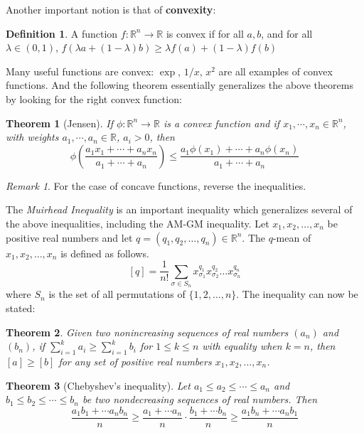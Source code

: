 \documentclass{article}
\newtheorem{theorem}{Theorem}[section]
\theoremstyle{definition}
\newtheorem{definition}{Definition}[section]
\theoremstyle{remark}
\newtheorem*{remark}{Remark}
\begin{document}
Another important notion is that of \textbf{convexity}:
\begin{definition}
A function $f: \mathbb{R}^n \rightarrow \mathbb{R}$ is convex if for all $a,b$, and for all $\lambda \in (0,1)$, $f(\lambda a + (1-\lambda)b) \ge \lambda f(a) + (1-\lambda)f(b)$
\end{definition}
Many useful functions are convex: $\exp$, $1/x$, $x^2$ are all examples of convex functions. And the following theorem essentially generalizes the above theorems by looking for the right convex function:
\begin{theorem}[Jensen]
If $\phi: \mathbb{R}^n \rightarrow \mathbb{R}$ is a convex function and if $x_1,\cdots,x_n \in \mathbb{R}^n$, with weights $a_1,\cdots,a_n \in \mathbb{R}$, $a_i > 0$, then  
\begin{equation}
    \phi \left( \frac{a_1x_1 + \cdots + a_nx_n}{a_1 + \cdots + a_n} \right) \le \frac{a_1\phi(x_1) + \cdots + a_n\phi(x_n)}{a_1 + \cdots + a_n}
\end{equation}
\end{theorem}
\begin{remark}
For the case of concave functions, reverse the inequalities.
\end{remark}
The \textit{Muirhead Inequality} is an important inequality which generalizes several of the above inequalities, including the AM-GM inequality. Let $x_1,x_2,\dots, x_n$ be positive real numbers and let $q = (q_1,q_2,\dots, q_n) \in \mathbb{R}^n$. The $q$-mean of $x_1,x_2,\dots, x_n$ is defined as follows.
\[
    [q] = \frac{1}{n!}\sum_{\sigma \in S_n} x_{\sigma_1}^{q_1} x_{\sigma_2}^{q_2} \dots x_{\sigma_n}^{q_n}
\]
where $S_n$ is the set of all permutations of $\{1,2,\dots,n\}$. The inequality can now be stated: 
\begin{theorem}
Given two nonincreasing sequences of real numbers $(a_n)$ and $(b_n)$, if $\sum_{i=1}^k a_i \geq \sum_{i=1}^k b_i$ for $1 \leq k \leq n$ with equality when $k = n$, then $[a] \geq [b]$ for any set of positive real numbers $x_1,x_2,\dots,x_n$.
\end{theorem}

\begin{theorem}[Chebyshev's inequality]
Let $a_{1} \leq a_{2} \leq \cdots \leq a_{n}$ and $b_{1} \leq b_{2} \leq \cdots \leq b_{n}$ be two nondecreasing sequences of real numbers. Then 
\begin{equation}
    \frac{a_{1}b_{1} + \cdots a_{n}b_{n}}{n} \geq \frac{a_{1} + \cdots a_{n}}{n} \cdot \frac{b_{1} + \cdots b_{n}}{n} \geq \frac{a_{1}b_{n} + \cdots a_{n}b_{1}}{n}
\end{equation}
\end{theorem}
\end{document}
